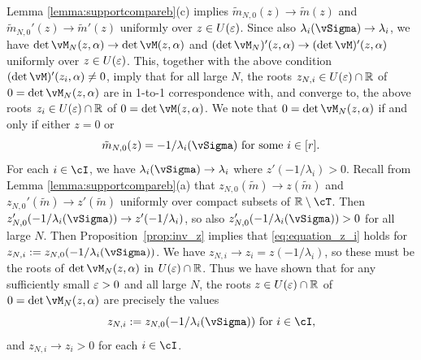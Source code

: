 \begin{proof-of-theorem}
Lemma \ref{lemma:supportcompareb}(c) implies
$\tilde m_{N,0}(z) \to \tilde m(z)$ and $\tilde m_{N,0}'(z) \to \tilde m'(z)$
uniformly over $z \in U(\varepsilon)$. Since also $\lambda_i(\vSigma) \to \lambda_i$,
we have $\det \vM_N(z,\alpha) \to \det \vM(z,\alpha)$ and
$(\det \vM_N)'(z,\alpha) \to (\det \vM)'(z,\alpha)$ uniformly over
$z \in U(\varepsilon)$. This, together with the above condition
$(\det \vM)'(z_i,\alpha) \neq 0$, imply
that for all large $N$, the roots $z_{N,i} \in U(\varepsilon) \cap \mathbb{R}$
of $0=\det \vM_N(z,\alpha)$
are in 1-to-1 correspondence with, and converge to, the above roots $z_i \in
U(\varepsilon) \cap \mathbb{R}$ of
$0=\det \vM(z,\alpha)$. We note that $0=\det\vM_N(z,\alpha)$ if and only if
either $z=0$ or
\begin{equation}\label{eq:equation_z_i}
\tilde{m}_{N,0}(z)=-1/\lambda_i(\vSigma) \text{ for some } i \in [r].
\end{equation}
For each $i \in \cI$, we have $\lambda_i(\vSigma) \to \lambda_i$ where
$z'(-1/\lambda_i)>0$. Recall from Lemma \ref{lemma:supportcompareb}(a)
that $z_{N,0}(\tilde m) \to z(\tilde m)$ and $z_{N,0}'(\tilde m) \to z'(\tilde m)$
uniformly over compact subsets of $\R \setminus \cT$.
Then $z_{N,0}'(-1/\lambda_i(\vSigma)) \to z'(-1/\lambda_i)$, so
also $z_{N,0}'(-1/\lambda_i(\vSigma))>0$ for all large $N$. Then
Proposition~\ref{prop:inv_z} implies that \eqref{eq:equation_z_i} holds
for $z_{N,i}:=z_{N,0}(-1/\lambda_i(\vSigma))$. We have
$z_{N,i} \to z_i=z(-1/\lambda_i)$, so these must be the
roots of $\det \vM_N(z,\alpha)$ in $U(\varepsilon) \cap \mathbb{R}$. Thus we have shown that
for any sufficiently small $\varepsilon>0$ and all large $N$,
the roots $z \in U(\varepsilon) \cap \mathbb{R}$ of $0=\det \vM_N(z,\alpha)$ are precisely
the values
\[z_{N,i}:=z_{N,0}(-1/\lambda_i(\vSigma)) \text{ for } i \in \cI,\]
and $z_{N,i} \to z_i>0$ for each $i \in \cI$.


\end{proof-of-theorem}
